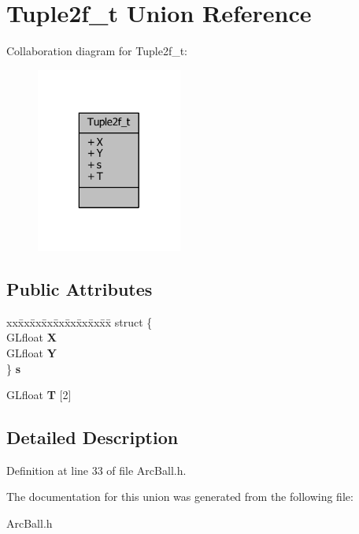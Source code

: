 \section{Tuple2f\-\_\-t Union Reference}
\label{unionTuple2f__t}


Collaboration diagram for Tuple2f\-\_\-t\-:
\nopagebreak
\begin{figure}[H]
\begin{center}
\leavevmode
\includegraphics[width=136pt]{d1/da1/unionTuple2f__t__coll__graph}
\end{center}
\end{figure}
\subsection*{Public Attributes}
\begin{DoxyCompactItemize}
\item 
\begin{tabbing}
xx\=xx\=xx\=xx\=xx\=xx\=xx\=xx\=xx\=\kill
struct \{\\
\>GLfloat {\bfseries X}\\
\>GLfloat {\bfseries Y}\\
\} {\bfseries s}\label{unionTuple2f__t_a18181db08b37a4ed3cb8eda4eb8b6a43}
\\

\end{tabbing}\item 
G\-Lfloat {\bfseries T} [2]\label{unionTuple2f__t_a479fac98fcde5341884913d5d51c6f0f}

\end{DoxyCompactItemize}


\subsection{Detailed Description}


Definition at line 33 of file Arc\-Ball.\-h.



The documentation for this union was generated from the following file\-:\begin{DoxyCompactItemize}
\item 
Arc\-Ball.\-h\end{DoxyCompactItemize}
